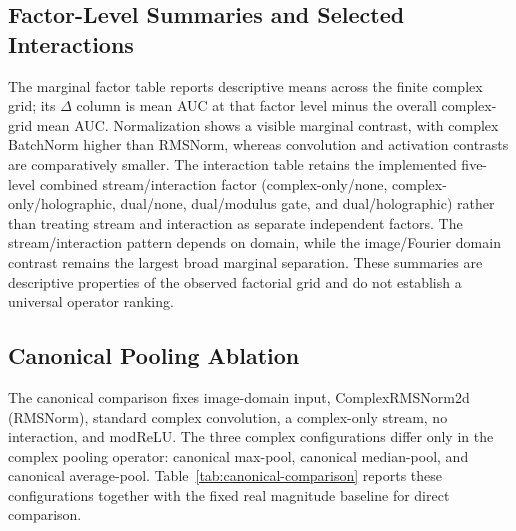 \begingroup
\renewenvironment{table}{\begin{table}}{\end{table}}

\endgroup

\subsection{Factor-Level Summaries and Selected Interactions}
The marginal factor table reports descriptive means across the finite complex grid; its $\Delta$ column is mean AUC at that factor level minus the overall complex-grid mean AUC. Normalization shows a visible marginal contrast, with complex BatchNorm higher than RMSNorm, whereas convolution and activation contrasts are comparatively smaller. The interaction table retains the implemented five-level combined stream/interaction factor (complex-only/none, complex-only/holographic, dual/none, dual/modulus gate, and dual/holographic) rather than treating stream and interaction as separate independent factors. The stream/interaction pattern depends on domain, while the image/Fourier domain contrast remains the largest broad marginal separation. These summaries are descriptive properties of the observed factorial grid and do not establish a universal operator ranking.

\begingroup
\renewenvironment{table}{\begin{table}}{\end{table}}


\endgroup

\subsection{Canonical Pooling Ablation}
The canonical comparison fixes image-domain input, ComplexRMSNorm2d (RMSNorm), standard complex convolution, a complex-only stream, no interaction, and modReLU. The three complex configurations differ only in the complex pooling operator: canonical max-pool, canonical median-pool, and canonical average-pool. Table~\ref{tab:canonical-comparison} reports these configurations together with the fixed real magnitude baseline for direct comparison.

\begingroup
\renewenvironment{table}{\begin{table}}{\end{table}}

\endgroup

